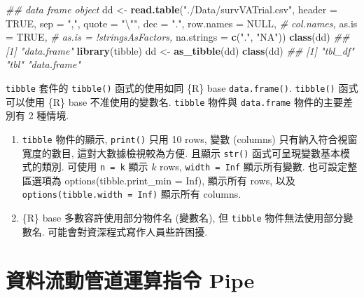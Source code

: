 \documentclass[
]{book}
\newenvironment{Shaded}{\begin{snugshade}}{\end{snugshade}}
\newcommand{\CharTok}[1]{\textcolor[rgb]{0.31,0.60,0.02}{#1}}
\newcommand{\CommentTok}[1]{\textcolor[rgb]{0.56,0.35,0.01}{\textit{#1}}}
\newcommand{\DataTypeTok}[1]{\textcolor[rgb]{0.13,0.29,0.53}{#1}}
\newcommand{\KeywordTok}[1]{\textcolor[rgb]{0.13,0.29,0.53}{\textbf{#1}}}
\newcommand{\NormalTok}[1]{#1}
\newcommand{\OtherTok}[1]{\textcolor[rgb]{0.56,0.35,0.01}{#1}}
\newcommand{\StringTok}[1]{\textcolor[rgb]{0.31,0.60,0.02}{#1}}
\begin{document}
\begin{Shaded}
\begin{Highlighting}[]
\CommentTok{\#\# data frame object}
\NormalTok{dd \textless{}{-}}\StringTok{ }\KeywordTok{read.table}\NormalTok{(}\StringTok{"./Data/survVATrial.csv"}\NormalTok{,}
                 \DataTypeTok{header =} \OtherTok{TRUE}\NormalTok{,}
                 \DataTypeTok{sep =} \StringTok{","}\NormalTok{,}
                 \DataTypeTok{quote =} \StringTok{"}\CharTok{\textbackslash{}"}\StringTok{\textquotesingle{}"}\NormalTok{,}
                 \DataTypeTok{dec =} \StringTok{"."}\NormalTok{,}
                 \DataTypeTok{row.names =} \OtherTok{NULL}\NormalTok{,}
                 \CommentTok{\# col.names,}
                 \DataTypeTok{as.is =} \OtherTok{TRUE}\NormalTok{,}
                 \CommentTok{\# as.is = !stringsAsFactors,}
                 \DataTypeTok{na.strings =} \KeywordTok{c}\NormalTok{(}\StringTok{"."}\NormalTok{, }\StringTok{"NA"}\NormalTok{))}
\KeywordTok{class}\NormalTok{(dd)}
\CommentTok{\#\# [1] "data.frame"}
\KeywordTok{library}\NormalTok{(tibble)}
\NormalTok{dd \textless{}{-}}\StringTok{ }\KeywordTok{as\_tibble}\NormalTok{(dd)}
\KeywordTok{class}\NormalTok{(dd)}
\CommentTok{\#\# [1] "tbl\_df"     "tbl"        "data.frame"}
\end{Highlighting}
\end{Shaded}

\texttt{tibble} 套件的 \texttt{tibble()} 函式的使用如同 \{R\} base \texttt{data.frame()}.
\texttt{tibble()} 函式可以使用 \{R\} base 不准使用的變數名.
\texttt{tibble} 物件與 \texttt{data.frame} 物件的主要差別有 2 種情境.

\begin{enumerate}
\def\labelenumi{\arabic{enumi}.}
\item
  \texttt{tibble} 物件的顯示, \texttt{print()} 只用 10 rows, 變數 (columns) 只有納入符合視窗寬度的數目, 這對大數據檢視較為方便.
  且顯示 \texttt{str()} 函式可呈現變數基本模式的類別.
  可使用 \texttt{n\ =\ k} 顯示 \(k\) rows,
  \texttt{width\ =\ Inf} 顯示所有變數.
  也可設定整區選項為
  options(tibble.print\_min = Inf), 顯示所有 rows,
  以及
  \texttt{options(tibble.width\ =\ Inf)} 顯示所有 columns.
\item
  \{R\} base 多數容許使用部分物件名 (變數名),
  但 \texttt{tibble} 物件無法使用部分變數名.
  可能會對資深程式寫作人員些許困擾.
\end{enumerate}

\hypertarget{ux8cc7ux6599ux6d41ux52d5ux7ba1ux9053ux904bux7b97ux6307ux4ee4-pipe}{%
\section{資料流動管道運算指令 Pipe}\label{ux8cc7ux6599ux6d41ux52d5ux7ba1ux9053ux904bux7b97ux6307ux4ee4-pipe}}
\end{document}

